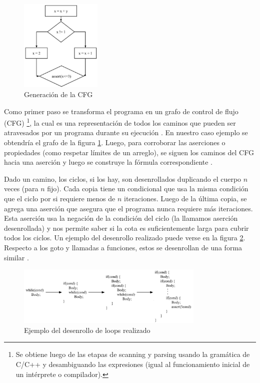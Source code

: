 \documentclass[runningheads]{llncs}
\begin{document}
\begin{figure}
  \centering
  \includegraphics[width=0.35\textwidth]{cfg-generation.jpeg}
  \caption{Generación de la CFG}
  \label{fig: cfg-generation}
  \vspace{-15pt}
\end{figure}
Como primer paso se transforma el programa en un grafo de control de flujo (CFG) \footnote{Se obtiene luego de las etapas de scanning y parsing usando la 
gramática de C/C++ y desambiguando las expresiones (igual al funcionamiento inicial de un intérprete o compilador).}, la cual es una representación de 
todos los caminos que pueden ser atravesados por un programa durante su ejecución \cite{cbmc-slides}. En nuestro caso ejemplo se obtendría el grafo de la figura \ref{fig: cfg-generation}.
Luego, para corroborar las aserciones o propiedades (como respetar límites de un arreglo), se siguen los caminos del CFG hacia una aserción y luego se construye 
la fórmula correspondiente \cite{cbmc-slides}.

Dado un camino, los ciclos, si los hay, son desenrollados duplicando el cuerpo $n$ veces (para $n$ fijo).
Cada copia tiene un condicional que usa la misma condición que el ciclo por si requiere menos de $n$ iteraciones.
Luego de la última copia, se agrega una aserción que asegura que el programa nunca requiere más iteraciones.
Esta aserción usa la negación de la condición del ciclo (la llamamos aserción desenrollada) y nos permite saber si la cota es suficientemente larga para cubrir todos los ciclos.
Un ejemplo del desenrollo realizado puede verse en la figura \ref{fig: loop-unwinding}.
Respecto a los goto y llamadas a funciones, estos se desenrollan de una forma similar \cite{tacas-2004}.

\begin{figure}[!htb]
  \centering
  \includegraphics[width=0.8\textwidth]{loop-unwinding.jpeg}
  \caption{Ejemplo del desenrollo de loops realizado}
  \label{fig: loop-unwinding}
\end{figure}
\end{document}
